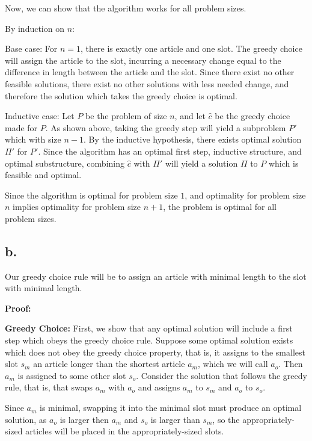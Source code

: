 \documentclass[11pt]{article}
\begin{document}
Now, we can show that the algorithm works for all problem sizes.

By induction on $n$:  

Base case: For $n=1$, there is exactly one article and one slot. The greedy choice will assign the article to the slot, incurring a necessary change equal to the difference in length between the article and the slot. Since there exist no other feasible solutions, there exist no other solutions with less needed change, and therefore the solution which takes the greedy choice is optimal. 

Inductive case: Let $P$ be the problem of size $n$, and let $\hat{c}$ be the greedy choice made for $P$. As shown above, taking the greedy step will yield a subproblem $P'$ which with size $n-1$. By the inductive hypothesis, there exists optimal solution $\Pi'$ for $P'$. Since the algorithm has an optimal first step, inductive structure, and optimal substructure, combining $\hat{c}$ with $\Pi'$ will yield a solution $\Pi$ to $P$ which is feasible and optimal. 

Since the algorithm is optimal for problem size $1$, and optimality for problem size $n$ implies optimality for problem size $n+1$, the problem is optimal for all problem sizes. \\ 

\subsection*{b.}


Our greedy choice rule will be to assign an article with minimal length to the slot with minimal length. 

\textbf{Proof: }

\textbf{Greedy Choice: }
First, we show that any optimal solution will include a first step which obeys the greedy choice rule. Suppose some optimal solution exists which does not obey the greedy choice property, that is, it assigns to the smallest slot $s_m$ an article longer than the shortest article $a_m$, which we will call $a_o$. Then $a_m$ is assigned to some other slot $s_o$. Consider the solution that follows the greedy rule, that is, that swaps $a_m$ with $a_o$ and assigns $a_m$ to $s_m$ and $a_o$ to $s_o$. 

Since $a_m$ is minimal, swapping it into the minimal slot must produce an optimal solution, as $a_o$ is larger then $a_m$ and $s_o$ is larger than $s_m$, so the appropriately-sized articles will be placed in the appropriately-sized slots. 
\end{document}
